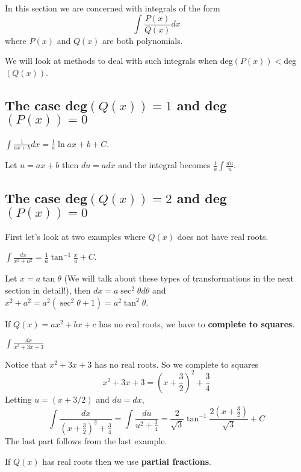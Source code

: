 \documentclass[calc1-main.tex]{subfiles}
\begin{document}
In this section we are concerned with integrals of the form
\[
	\int \frac{P(x)}{Q(x)} dx
\]
where $P(x)$ and $Q(x)$ are both polynomials.

We will look at methods to deal with such integrals when deg$(P(x)) <$deg$(Q(x))$.

\subsection*{The case deg$(Q(x)) = 1$ and deg$(P(x)) = 0$}
\begin{example}
	$\displaystyle \int \frac{1}{ax + b} dx = \frac{1}{a} \ln{ax+b} + C$.
\end{example}
\begin{solution}
	Let $u= ax+b$ then $du = adx$ and the integral becomes $\frac{1}{a}\int \frac{du}{u}$.
\end{solution}

\subsection*{The case deg$(Q(x)) = 2$ and deg$(P(x)) = 0$}
First let's look at two examples where $Q(x)$ does not have real roots.
\begin{example}
	$\displaystyle \int \frac{dx}{x^2+a^2} = \frac{1}{a} \tan^{-1} \frac{x}{a} + C$.
\end{example}
\begin{solution}
	Let $x=a\tan \theta$ (We will talk about these types of transformations in the next section in detail!), then $dx = a \sec^2 \theta d\theta$ and $x^2+a^2 = a^2(\sec^2\theta + 1) = a^2 \tan^2 \theta$.
\end{solution}

If $Q(x) = a x^2 + bx + c$ has no real roots, we have to \textbf{complete to squares}.
\begin{example}
	$ \displaystyle \int \frac{dx}{x^2 + 3x + 3}$
\end{example}
\begin{solution}
	Notice that $x^2 + 3x + 3$ has no real roots. So we complete to squares
	\[
		x^2 + 3x + 3 = (x + \frac{3}{2})^2 + \frac{3}{4}
	\]
	Letting $u = (x+3/2)$ and $du = dx$,
	\[
		\int \frac{dx}{(x + \frac{3}{2})^2 + \frac{3}{4}} =
		\int \frac{du}{u^2 + \frac{3}{4}} = \frac{2}{\sqrt{3}} \tan^{-1} \frac{2(x+\frac{3}{2})}{\sqrt{3}}  + C
	\]
	The last part follows from the last example.
\end{solution}

If $Q(x)$ has real roots then we use \textbf{partial fractions}.
\end{document}
